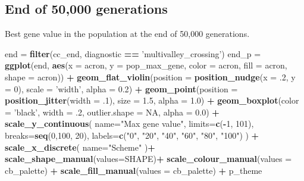 \documentclass[]{book}
\newenvironment{Shaded}{\begin{snugshade}}{\end{snugshade}}
\newcommand{\DataTypeTok}[1]{\textcolor[rgb]{0.13,0.29,0.53}{#1}}
\newcommand{\DecValTok}[1]{\textcolor[rgb]{0.00,0.00,0.81}{#1}}
\newcommand{\FloatTok}[1]{\textcolor[rgb]{0.00,0.00,0.81}{#1}}
\newcommand{\KeywordTok}[1]{\textcolor[rgb]{0.13,0.29,0.53}{\textbf{#1}}}
\newcommand{\NormalTok}[1]{#1}
\newcommand{\OperatorTok}[1]{\textcolor[rgb]{0.81,0.36,0.00}{\textbf{#1}}}
\newcommand{\OtherTok}[1]{\textcolor[rgb]{0.56,0.35,0.01}{#1}}
\newcommand{\StringTok}[1]{\textcolor[rgb]{0.31,0.60,0.02}{#1}}
\begin{document}
\hypertarget{end-of-50000-generations-7}{%
\subsection{End of 50,000 generations}\label{end-of-50000-generations-7}}

Best gene value in the population at the end of 50,000 generations.

\begin{Shaded}
\begin{Highlighting}[]
\NormalTok{end =}\StringTok{ }\KeywordTok{filter}\NormalTok{(cc_end, diagnostic }\OperatorTok{==}\StringTok{ 'multivalley_crossing'}\NormalTok{)}
\NormalTok{end_p =}\StringTok{ }\KeywordTok{ggplot}\NormalTok{(end, }\KeywordTok{aes}\NormalTok{(}\DataTypeTok{x =}\NormalTok{ acron, }\DataTypeTok{y =}\NormalTok{ pop_max_gene, }\DataTypeTok{color =}\NormalTok{ acron, }\DataTypeTok{fill =}\NormalTok{ acron, }\DataTypeTok{shape =}\NormalTok{ acron)) }\OperatorTok{+}
\StringTok{  }\KeywordTok{geom_flat_violin}\NormalTok{(}\DataTypeTok{position =} \KeywordTok{position_nudge}\NormalTok{(}\DataTypeTok{x =} \FloatTok{.2}\NormalTok{, }\DataTypeTok{y =} \DecValTok{0}\NormalTok{), }\DataTypeTok{scale =} \StringTok{'width'}\NormalTok{, }\DataTypeTok{alpha =} \FloatTok{0.2}\NormalTok{) }\OperatorTok{+}
\StringTok{  }\KeywordTok{geom_point}\NormalTok{(}\DataTypeTok{position =} \KeywordTok{position_jitter}\NormalTok{(}\DataTypeTok{width =} \FloatTok{.1}\NormalTok{), }\DataTypeTok{size =} \FloatTok{1.5}\NormalTok{, }\DataTypeTok{alpha =} \FloatTok{1.0}\NormalTok{) }\OperatorTok{+}
\StringTok{  }\KeywordTok{geom_boxplot}\NormalTok{(}\DataTypeTok{color =} \StringTok{'black'}\NormalTok{, }\DataTypeTok{width =} \FloatTok{.2}\NormalTok{, }\DataTypeTok{outlier.shape =} \OtherTok{NA}\NormalTok{, }\DataTypeTok{alpha =} \FloatTok{0.0}\NormalTok{) }\OperatorTok{+}
\StringTok{  }\KeywordTok{scale_y_continuous}\NormalTok{(}
    \DataTypeTok{name=}\StringTok{"Max gene value"}\NormalTok{,}
    \DataTypeTok{limits=}\KeywordTok{c}\NormalTok{(}\OperatorTok{-}\DecValTok{1}\NormalTok{, }\DecValTok{101}\NormalTok{),}
    \DataTypeTok{breaks=}\KeywordTok{seq}\NormalTok{(}\DecValTok{0}\NormalTok{,}\DecValTok{100}\NormalTok{, }\DecValTok{20}\NormalTok{),}
    \DataTypeTok{labels=}\KeywordTok{c}\NormalTok{(}\StringTok{"0"}\NormalTok{, }\StringTok{"20"}\NormalTok{, }\StringTok{"40"}\NormalTok{, }\StringTok{"60"}\NormalTok{, }\StringTok{"80"}\NormalTok{, }\StringTok{"100"}\NormalTok{)}
\NormalTok{  ) }\OperatorTok{+}
\StringTok{  }\KeywordTok{scale_x_discrete}\NormalTok{(}
    \DataTypeTok{name=}\StringTok{"Scheme"}
\NormalTok{  )}\OperatorTok{+}
\StringTok{  }\KeywordTok{scale_shape_manual}\NormalTok{(}\DataTypeTok{values=}\NormalTok{SHAPE)}\OperatorTok{+}
\StringTok{  }\KeywordTok{scale_colour_manual}\NormalTok{(}\DataTypeTok{values =}\NormalTok{ cb_palette) }\OperatorTok{+}
\StringTok{  }\KeywordTok{scale_fill_manual}\NormalTok{(}\DataTypeTok{values =}\NormalTok{ cb_palette) }\OperatorTok{+}
\StringTok{  }\NormalTok{p_theme}


\end{Highlighting}
\end{Shaded}
\end{document}
